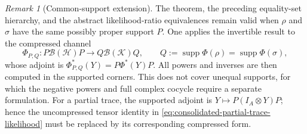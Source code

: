 \documentclass[11pt]{article}
\theoremstyle{remark}
\newtheorem{remark}[remark]{Remark}
\newcommand{\1}{\mathbbm{1}}
\begin{document}
\begin{remark}[Common-support extension]
The theorem, the preceding equality-set hierarchy, and the abstract
likelihood-ratio equivalences remain valid when $\rho$ and $\sigma$
have the same possibly proper support $P$.  One applies the invertible
result to the compressed channel
\begin{equation}
 \Phi_{P,Q}:P\mathcal B(\mathcal H)P
 \longrightarrow Q\mathcal B(\mathcal K)Q,
 \qquad Q:=\operatorname{supp}\Phi(\rho)
          =\operatorname{supp}\Phi(\sigma),
\end{equation}
whose adjoint is
$\Phi_{P,Q}^*(Y)=P\Phi^*(Y)P$.  All powers and inverses are then
computed in the supported corners.  This does not cover unequal
supports, for which the negative powers and full complex cocycle
require a separate formulation.
For a partial trace, the supported adjoint is
$Y\mapsto P(I_A\otimes Y)P$; hence the uncompressed tensor identity
in \eqref{eq:consolidated-partial-trace-likelihood} must be replaced
by its corresponding compressed form.
\end{remark}
\end{document}
